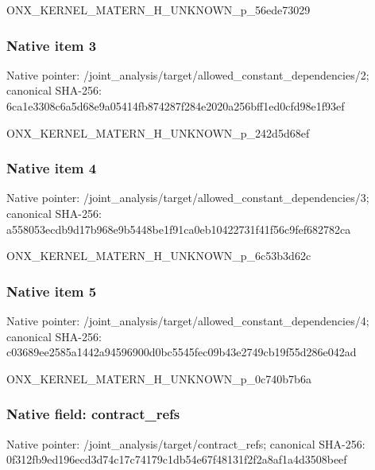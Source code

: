 \documentclass[10pt,a4paper]{article}
\begin{document}
\begingroup\raggedright\sloppy ONX\_\allowbreak{}KERNEL\_\allowbreak{}MATERN\_\allowbreak{}H\_\allowbreak{}UNKNOWN\_\allowbreak{}p\_\allowbreak{}56ede73029\par\endgroup

\subsubsection{Native item 3}
Native pointer: /joint\_\allowbreak{}analysis/target/allowed\_\allowbreak{}constant\_\allowbreak{}dependencies/2; canonical SHA-256: 6ca1e3308c6a5d68e9a05414fb874287f284e2020a256bff1ed0cfd98e1f93ef

\begingroup\raggedright\sloppy ONX\_\allowbreak{}KERNEL\_\allowbreak{}MATERN\_\allowbreak{}H\_\allowbreak{}UNKNOWN\_\allowbreak{}p\_\allowbreak{}242d5d68ef\par\endgroup

\subsubsection{Native item 4}
Native pointer: /joint\_\allowbreak{}analysis/target/allowed\_\allowbreak{}constant\_\allowbreak{}dependencies/3; canonical SHA-256: a558053ecdb9d17b968e9b5448be1f91ca0eb10422731f41f56c9fef682782ca

\begingroup\raggedright\sloppy ONX\_\allowbreak{}KERNEL\_\allowbreak{}MATERN\_\allowbreak{}H\_\allowbreak{}UNKNOWN\_\allowbreak{}p\_\allowbreak{}6c53b3d62c\par\endgroup

\subsubsection{Native item 5}
Native pointer: /joint\_\allowbreak{}analysis/target/allowed\_\allowbreak{}constant\_\allowbreak{}dependencies/4; canonical SHA-256: c03689ee2585a1442a94596900d0bc5545fec09b43e2749cb19f55d286e042ad

\begingroup\raggedright\sloppy ONX\_\allowbreak{}KERNEL\_\allowbreak{}MATERN\_\allowbreak{}H\_\allowbreak{}UNKNOWN\_\allowbreak{}p\_\allowbreak{}0c740b7b6a\par\endgroup

\subsubsection{Native field: contract\_\allowbreak{}refs}
Native pointer: /joint\_\allowbreak{}analysis/target/contract\_\allowbreak{}refs; canonical SHA-256: 0f312fb9ed196ecd3d74c17c74179c1db54e67f48131f2f2a8af1a4d3508beef
\end{document}

